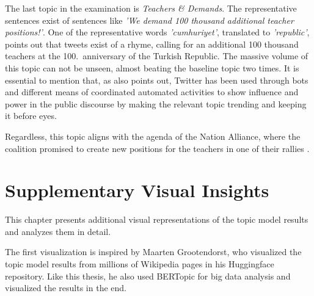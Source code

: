 The last topic in the examination is \textit{Teachers \& Demands}. The representative sentences exist 
of sentences like \textit{'We demand 100 thousand additional teacher positions!'}. One of the 
representative words \textit{'cumhuriyet'}, translated to \textit{'republic'}, points out that tweets 
exist of a rhyme, calling for an additional 100 thousand teachers at the 100.\ anniversary of the Turkish 
Republic. The massive volume of this topic can not be unseen, almost beating the baseline topic two times. 
It is essential to mention that, as \textcite{pfeffer_twitter_24_Hours_just_another_day_2023} also points 
out, Twitter has been used through bots and different means of coordinated automated activities to show 
influence and power in the public discourse by making the relevant topic trending and keeping it before eyes.

Regardless, this topic aligns with the agenda of the Nation Alliance, where the coalition promised to 
create new positions for the teachers in one of their rallies \parencite{trt_ogretmen_atamasi_kk_2023}.


\section{Supplementary Visual Insights}

This chapter presents additional visual representations of the topic model results and analyzes them in detail.  

The first visualization is inspired by Maarten Grootendorst, who visualized the topic model 
results from millions of Wikipedia pages in his Huggingface 
repository. Like this thesis, 
he also used BERTopic for big data analysis and visualized the results in the end. 

